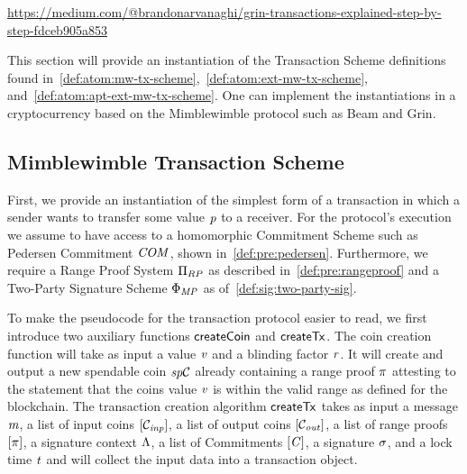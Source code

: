 \urldef\urlgrinexplained\url{https://medium.com/@brandonarvanaghi/grin-transactions-explained-step-by-step-fdceb905a853}

This section will provide an instantiation of the Transaction Scheme definitions found in~\cref{def:atom:mw-tx-scheme},~\cref{def:atom:ext-mw-tx-scheme}, and~\cref{def:atom:apt-ext-mw-tx-scheme}.
One can implement the instantiations in a cryptocurrency based on the Mimblewimble protocol such as Beam and Grin.

\subsection{Mimblewimble Transaction Scheme}\label{subsec:atom:mw-tx-scheme}

First, we provide an instantiation of the simplest form of a transaction in which a sender wants to transfer some value $\mathit{p}$ to a receiver.
For the protocol's execution we assume to have access to a homomorphic Commitment Scheme such as Pedersen Commitment $\mathit{COM}$, shown in~\cref{def:pre:pedersen}.
Furthermore, we require a Range Proof System $\Pi_{RP}$ as described in~\cref{def:pre:rangeproof} and a Two-Party Signature Scheme $\Phi_{\mathit{MP}}$ as of~\cref{def:sig:two-party-sig}.

To make the pseudocode for the transaction protocol easier to read, we first introduce two auxiliary functions $\mathsf{createCoin}$
and $\mathsf{createTx}$.
The coin creation function will take as input a value $\mathit{v}$ and a blinding factor $\mathit{r}$. It will create and output a new spendable coin $\mathit{sp}\mathcal{C}$ already containing a range proof $\pi$ attesting to the statement that the coins value $\mathit{v}$ is within the valid range as defined for the blockchain.
The transaction creation algorithm $\mathsf{createTx}$ takes as input a message $\mathit{m}$, a list of input coins $[\mathcal{C}_{\mathit{inp}}]$, a list of output coins $[\mathcal{C}_{\mathit{out}}]$, a list of range proofs $[\pi]$, a signature context $\Lambda$, a list of Commitments $[\mathit{C}]$, a signature $\sigma$, and a lock time $\mathit{t}$ and will collect the input data into a transaction object.

